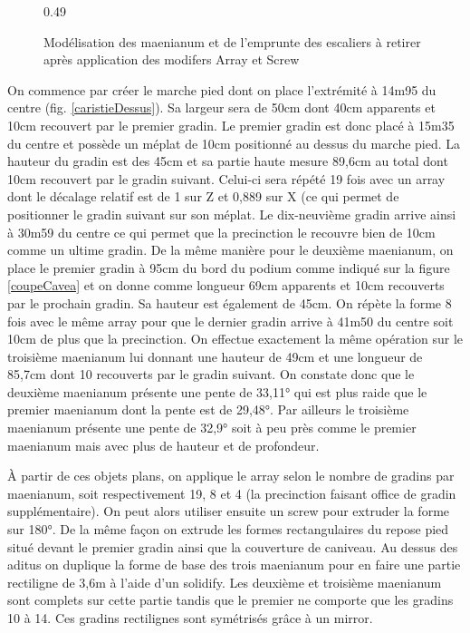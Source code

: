 \begin{figure}[!h]
\begin{subfigureth}{0.49\textwidth}
		\caption[Modélisation des \gls{maenianum}]{Modélisation des \gls{maenianum} et de l'emprunte des escaliers à retirer après application des modifers Array et Screw}
		\label{modelMaenianum} 		
	\end{subfigureth}	
\end{figure}

On commence par créer le marche pied dont on place l'extrémité à 14m95 du centre (fig. \ref{caristieDessus}). Sa largeur sera de 50cm dont 40cm apparents et 10cm recouvert par le premier gradin. Le premier gradin est donc placé à 15m35 du centre et possède un méplat de 10cm positionné au dessus du marche pied. La hauteur du gradin est des 45cm et sa partie haute mesure 89,6cm au total dont 10cm recouvert par le gradin suivant. Celui-ci sera répété 19 fois avec un \gls{array} dont le décalage relatif est de 1 sur Z et 0,889 sur X (ce qui permet de positionner le gradin suivant sur son méplat. Le dix-neuvième gradin arrive ainsi à 30m59 du centre ce qui permet que la precinction le recouvre bien de 10cm comme un ultime gradin. De la même manière pour le deuxième maenianum, on place le premier gradin à 95cm du bord du podium comme indiqué sur la figure \ref{coupeCavea} et on donne comme longueur 69cm apparents et 10cm recouverts par le prochain gradin. Sa hauteur est également de 45cm. On répète la forme 8 fois avec le même \gls{array} pour que le dernier gradin arrive à 41m50 du centre soit 10cm de plus que la precinction. On effectue exactement la même opération sur le troisième maenianum lui donnant une hauteur de 49cm et une longueur de 85,7cm dont 10 recouverts par le gradin suivant. On constate donc que le deuxième maenianum présente une pente de 33,11° qui est plus raide que le premier maenianum dont la pente est de 29,48°. Par ailleurs le troisième maenianum présente une pente de 32,9° soit à peu près comme le premier maenianum mais avec plus de hauteur et de profondeur.

\`{A} partir de ces objets plans, on applique le \gls{array} selon le nombre de gradins par maenianum, soit respectivement 19, 8 et 4 (la precinction faisant office de gradin supplémentaire). On peut alors utiliser ensuite un \gls{screw} pour extruder la forme sur 180°. De la même façon on extrude les formes rectangulaires du repose pied situé devant le premier gradin ainsi que la couverture de caniveau. Au dessus des aditus on duplique la forme de base des trois maenianum pour en faire une partie rectiligne de 3,6m à l'aide d'un \gls{solidify}. Les deuxième et troisième maenianum sont complets sur cette partie tandis que le premier ne comporte que les gradins 10 à 14. Ces gradins rectilignes sont symétrisés grâce à un \gls{mirror}.

